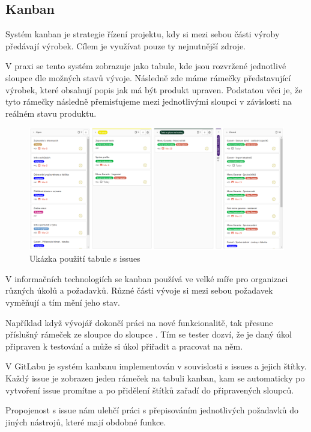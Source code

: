 \documentclass[czech,BP]{thesiskiv}
\begin{document}
\subsection{Kanban}
	\par Systém kanban je strategie řízení projektu, kdy si mezi sebou části výroby předávají výrobek. Cílem je využívat pouze ty nejnutnější zdroje.
	\par V praxi se tento systém zobrazuje jako tabule, kde jsou rozvržené jednotlivé sloupce dle možných stavů vývoje. Následně zde máme rámečky představující výrobek, které obsahují popis jak má být produkt upraven. Podstatou věci je, že tyto rámečky následně přemisťujeme mezi jednotlivými sloupci v závislosti na reálném stavu produktu.
	\begin{figure}[H]
		\centering
		\includegraphics[width=\textwidth]{img/rizeni_projektu/kanban}
		\caption{Ukázka použití tabule s issues}
	\end{figure}
	\par V informačních technologiích se kanban používá ve velké míře pro organizaci různých úkolů a požadavků. Různé části vývoje si mezi sebou požadavek vyměňují a tím mění jeho stav.
	\par Například když vývojář dokončí práci na nové funkcionalitě, tak přesune příslušný rámeček ze sloupce  do sloupce . Tím se tester dozví, že je daný úkol připraven k testování a může si úkol přiřadit a pracovat na něm.
	\par V GitLabu je systém kanbanu implementován v souvislosti s issues a jejich štítky. Každý issue je zobrazen jeden rámeček na tabuli kanban, kam se automaticky po vytvoření issue promítne a po přidělení štítků zařadí do připravených sloupců.
	\par Propojenost s issue nám ulehčí práci s přepisováním jednotlivých požadavků do jiných nástrojů, které mají obdobné funkce.
\end{document}
